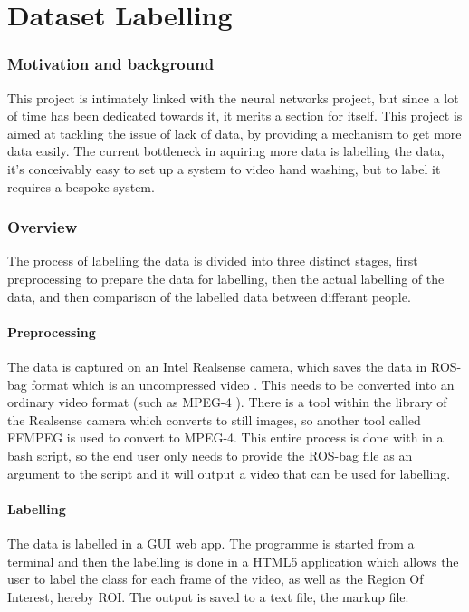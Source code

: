 \part{Dataset Labelling}
\section{Motivation and background}
This project is intimately linked with the neural networks project, but since a lot of time has been dedicated towards it, it merits a section for itself. This project is aimed at tackling the issue of lack of data, by providing a mechanism to get more data easily. The current bottleneck in aquiring more data is labelling the data, it's conceivably easy to set up a system to video hand washing, but to label it requires a bespoke system.

\section{Overview}
The process of labelling the data is divided into three distinct stages, first preprocessing to prepare the data for labelling, then the actual labelling of the data, and then comparison of the labelled data between differant people.
    \subsection{Preprocessing}
    The data is captured on an Intel Realsense camera, which saves the data in ROS-bag format which is an uncompressed video \cite{intelrosbag}. This needs to be converted into an ordinary video format (such as MPEG-4 \cite{wiegand2003overview}). There is a tool within the library of the Realsense camera which converts to still images, so another tool called FFMPEG \cite{ffmpeg} is used to convert to MPEG-4. This entire process is done with in a bash script, so the end user only needs to provide the ROS-bag file as an argument to the script and it will output a video that can be used for labelling.
    \subsection{Labelling}
    The data is labelled in a GUI web app. The programme is started from a terminal and then the labelling is done in a HTML5 application which allows the user to label the class for each frame of the video, as well as the Region Of Interest, hereby ROI. The output is saved to a text file, the markup file.

